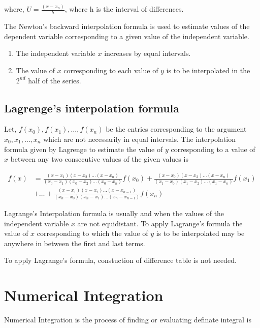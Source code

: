 \documentclass{article}
\begin{document}
                where, $U=\frac{(x-x_n)}{h}$, where h is the interval of differences.
                
                The Newton's backward interpolation formula is used to estimate values of the dependent 
                variable corresponding to a given value of the independent variable.

                \begin{enumerate}
                  \item The independent variable $x$ increases by equal intervals.
                  \item The value of $x$ corresponding to each value of $y$ is to be interpolated in 
                    the $2^{nd}$ half of the series.
                \end{enumerate}
              
              \subsection{Lagrenge's interpolation formula}
              Let, $f(x_0),f(x_1),\dots,f(x_n)$ be the entries corresponding to the argument 
              $x_0,x_1,\dots,x_n$ which are not necessarily in equal intervals. The interpolation 
              formula given by Lagrenge to estimate the value of $y$ corresponding to a value of $x$ 
              between any two consecutive values of the given values is

              \begin{align*}
                f(x)&=\frac{(x-x_1)(x-x_2)\dots(x-x_n)}{(x_0-x_1)(x_0-x_2)\dots(x_0-x_n)}f(x_0)+\frac{(x-x_0)(x-x_2)\dots(x-x_n)}{(x_1-x_0)(x_1-x_2)\dots(x_1-x_n)}f(x_1)\\
                &+ \dots +\frac{(x-x_1)(x-x_2)\dots(x-x_{n-1})}{(x_n-x_0)(x_n-x_1)\dots(x_n-x_{n-1})}f(x_n)
              \end{align*}

              Lagrange's Interpolation formula is usually and when the values of the independent
              variable $x$ are not equidistant. To apply Lagrange's formula the value of $x$ 
              corresponding to which the value of $y$ is to be interpolated may be anywhere in 
              between the first and last terms.
              
              To apply Lagrange's formula, constuction of difference table is not needed.
            
            \section{Numerical Integration}
              Numerical Integration is the process of finding or evaluating definate integral is 
              
\end{document}
